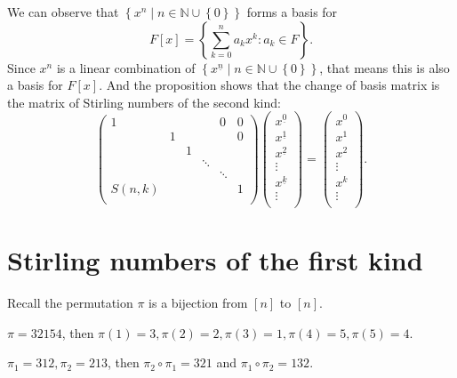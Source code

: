 We can observe that \(\left\{ x^n \mid n \in \mathbb{N} \cup \left\{ 0 \right\}  \right\} \) forms a basis for 
\[
    F[x] = \left\{ \sum_{k=0}^n a_k x^k : a_k \in F  \right\}. 
\] 
Since \(x^n\) is a linear combination of \(\left\{ x^{\underline{n}} \mid n \in \mathbb{N} \cup \left\{ 0 \right\}  \right\} \), that means this is also a basis for \(F[x]\). And the proposition shows that the change of basis matrix is the matrix of Stirling numbers of the second kind: 
\[
    \begin{pmatrix}
         1&  &  &  & 0 & 0  \\
         &  1&  &  &  & 0  \\
         &  &  1&  &  &   \\
         &  &  &  \ddots&  &   \\
         &  &  &  &  \ddots&   \\
         S(n, k)&  &  &  &  &1   \\
    \end{pmatrix}
    \begin{pmatrix}
         x^{\underline{0}} \\
         x^{\underline{1}}  \\
         x^{\underline{2}}  \\
         \vdots \\
          x^{\underline{k}} \\
          \vdots\\
    \end{pmatrix} = 
    \begin{pmatrix}
         x^0 \\
         x^1 \\
         x^2\\
          \vdots\\
          x^k\\
          \vdots\\
    \end{pmatrix}.
\]   
\section{Stirling numbers of the first kind}
    Recall the permutation \(\pi \) is a bijection from \([n]\) to \([n]\). 

\begin{eg}
    \(\pi = 32154\), then \(\pi (1) = 3, \pi (2) = 2, \pi (3) = 1, \pi (4) = 5, \pi (5) = 4\). 
\end{eg}

\begin{eg}
    \(\pi _1 = 312, \pi _2 = 213\), then \(\pi _2 \circ \pi _1 = 321\) and \(\pi _1 \circ \pi _2 = 132\).  
\end{eg}

